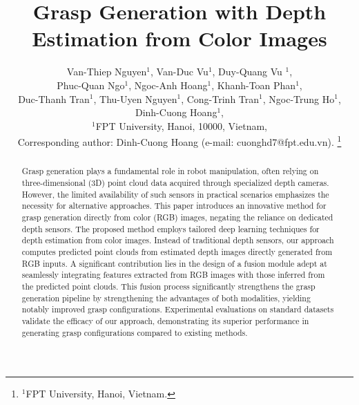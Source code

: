 \documentclass[usletter, 10pt, conference]{ieeeconf}
\title{Grasp Generation with Depth Estimation from Color Images}
\author
{Van-Thiep Nguyen$^{1}$, Van-Duc Vu$^{1}$, Duy-Quang Vu $^{1}$, \\ Phuc-Quan Ngo$^{1}$, Ngoc-Anh Hoang$^{1}$, Khanh-Toan Phan$^{1}$, \\ Duc-Thanh Tran$^{1}$, Thu-Uyen Nguyen$^{1}$, Cong-Trinh Tran$^{1}$, Ngoc-Trung Ho$^{1}$, Dinh-Cuong Hoang$^{1}$, \\ $^{1}$FPT University, Hanoi, 10000, Vietnam, \\ Corresponding author: Dinh-Cuong Hoang (e-mail: cuonghd7@fpt.edu.vn). %
\thanks{$^{1}$FPT University, Hanoi, Vietnam.}%
}
\begin{document}
\maketitle
\thispagestyle{empty}
\pagestyle{empty}


\begin{abstract}

Grasp generation plays a fundamental role in robot manipulation, often relying on three-dimensional (3D) point cloud data acquired through specialized depth cameras. However, the limited availability of such sensors in practical scenarios emphasizes the necessity for alternative approaches. This paper introduces an innovative method for grasp generation directly from color (RGB) images, negating the reliance on dedicated depth sensors. The proposed method employs tailored deep learning techniques for depth estimation from color images. Instead of traditional depth sensors, our approach computes predicted point clouds from estimated depth images directly generated from RGB inputs. A significant contribution lies in the design of a fusion module adept at seamlessly integrating features extracted from RGB images with those inferred from the predicted point clouds. This fusion process significantly strengthens the grasp generation pipeline by strengthening the advantages of both modalities, yielding notably improved grasp configurations. Experimental evaluations on standard datasets validate the efficacy of our approach, demonstrating its superior performance in generating grasp configurations compared to existing methods.

\end{abstract}


 
%

%

%

%


\end{document}
